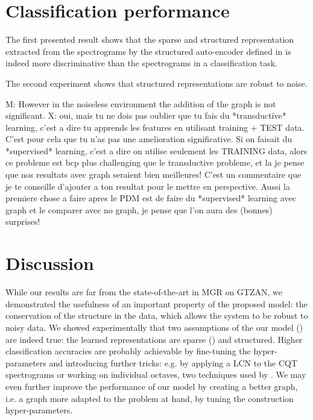 
\section{Classification performance}

The first presented result shows that the sparse and structured representation extracted from the spectrograms by the structured auto-encoder defined in  is indeed more discriminative than the spectrograms in a classification task.

The second experiment shows that structured representations are robust to noise.

M: However in the noiseless environment the addition of the graph is not significant.
X: oui, mais tu ne dois pas oublier que tu fais du *transductive* learning, c'est a dire tu apprends les features en utilisant training + TEST data. C'est pour cela que tu n'as pas une amelioration significative. Si on faisait du *supervised* learning, c'est a dire on utilise seulement les TRAINING data, alors ce probleme est bcp plus challenging que le transductive probleme, et la je pense que nos resultats avec graph seraient bien meilleures! C'est un commentaire que je te conseille d'ajouter a ton resultat pour le mettre en perspective. Aussi la premiere chose a faire apres le PDM est de faire du *supervised* learning avec graph et le comparer avec no graph, je pense que l'on aura des (bonnes) surprises!


\section{Discussion}

While our results are far from the state-of-the-art in \gls{MGR} on GTZAN, we demonstrated the usefulness of an important property of the proposed model: the conservation of the structure in the data, which allows the system to be robust to noisy data.
We showed experimentally that two assumptions of the our model () are indeed true: the learned representations are sparse () and structured.
Higher classification accuracies are probably achievable by fine-tuning the hyper-parameters and introducing further tricks: e.g. by applying a \gls{LCN} to the \gls{CQT} spectrograms or working on individual octaves, two techniques used by \cite{lecun2011PSDaudio}. We may even further improve the performance of our model by creating a better graph, i.e. a graph more adapted to the problem at hand, by tuning the construction hyper-parameters.